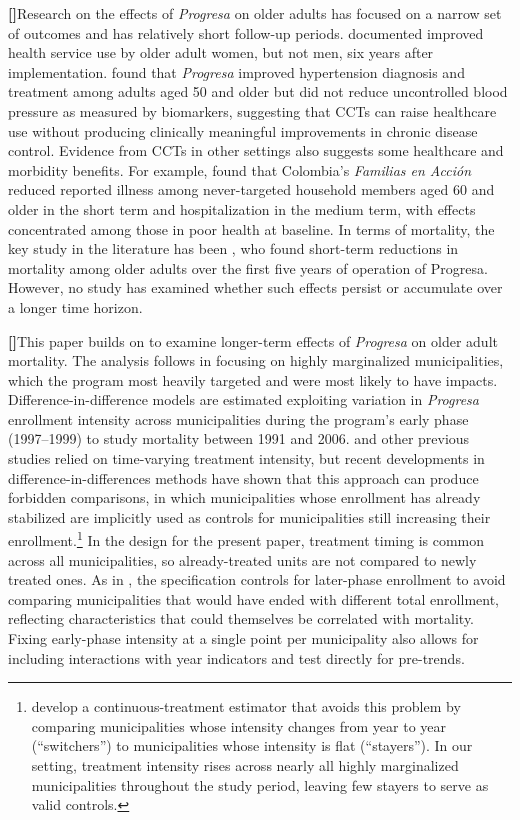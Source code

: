\documentclass[12pt]{article}
\newcounter{paragraphnum}
\newcommand{\p}{\refstepcounter{paragraphnum}\textbf{[\theparagraphnum]}\enspace}
\begin{document}
\p Research on the effects of \textit{Progresa} on older adults has focused on a narrow set of outcomes and has relatively short follow-up periods. \cite{BehrmanParker2013Demography} documented improved health service use by older adult women, but not men, six years after implementation. \cite{aguila2024conditional} found that \textit{Progresa} improved hypertension diagnosis and treatment among adults aged 50 and older but did not reduce uncontrolled blood pressure as measured by biomarkers, suggesting that CCTs can raise healthcare use without producing clinically meaningful improvements in chronic disease control. Evidence from CCTs in other settings also suggests some healthcare and morbidity benefits. For example, \cite{ContrerasSuarezMaitra2021JPopEcon} found that Colombia's \textit{Familias en Acci\'on} reduced reported illness among never-targeted household members aged 60 and older in the short term and hospitalization in the medium term, with effects concentrated among those in poor health at baseline. In terms of mortality, the key study in the literature has been \cite{BarhamRowberry2013JDE}, who found short-term reductions in mortality among older adults over the first five years of operation of Progresa. However, no study has examined whether such effects persist or accumulate over a longer time horizon. 



\p This paper builds on \cite{BarhamRowberry2013JDE} to examine longer-term effects of \textit{Progresa} on older adult mortality. The analysis follows \cite{parker2023conditional} in focusing on highly marginalized municipalities, which the program most heavily targeted and were most likely to have impacts. Difference-in-difference models are estimated exploiting variation in \textit{Progresa} enrollment intensity across municipalities during the program's early phase (1997--1999) to study mortality between 1991 and 2006. \cite{BarhamRowberry2013JDE} and other previous studies relied on time-varying treatment intensity, but recent developments in difference-in-differences methods have shown that this approach can produce forbidden comparisons, in which municipalities whose enrollment has already stabilized are implicitly used as controls for municipalities still increasing their enrollment.\footnote{\citet{deChaisemartinDHaultfoeuille2024IntertemporalDiD} develop a continuous-treatment estimator that avoids this problem by comparing municipalities whose intensity changes from year to year (``switchers'') to municipalities whose intensity is flat (``stayers''). In our setting, treatment intensity rises across nearly all highly marginalized municipalities throughout the study period, leaving few stayers to serve as valid controls.} In the design for the present paper, treatment timing is common across all municipalities, so already-treated units are not compared to newly treated ones. As in \citet{parker2023conditional}, the specification controls for later-phase enrollment to avoid comparing municipalities that would have ended with different total enrollment, reflecting characteristics that could themselves be correlated with mortality. Fixing early-phase intensity at a single point per municipality also allows for including interactions with year indicators and test directly for pre-trends.
\end{document}
